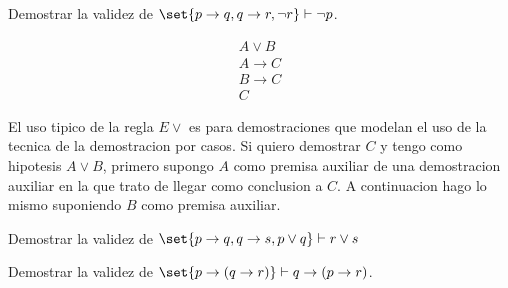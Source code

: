 \begin{example}
	Demostrar la validez de \(\set{p\rightarrow q, q \rightarrow r, \neg r} \vdash \neg p \).

\end{example}

\begin{definition}
	\[
		\begin{array}{c}
			A \vee B        \\
			A \rightarrow C \\
			B \rightarrow C \\ \hline
			C
		\end{array}
	\]
\end{definition}

\begin{remark}
	El uso tipico de la regla \(E \vee \) es para demostraciones que modelan el uso de la tecnica de la demostracion por casos. Si quiero demostrar \(C \) y tengo como hipotesis \(A \vee  B \), primero supongo \(A \) como premisa auxiliar de una demostracion auxiliar en la que trato de llegar como conclusion a \(C \). A continuacion hago lo mismo suponiendo \(B \) como premisa auxiliar.
\end{remark}

\begin{example}
	Demostrar la validez de \(\set{p \rightarrow q, q \rightarrow s, p \vee  q} \vdash r \vee s\)

\end{example}
\begin{example}
	Demostrar la validez de \(\set{p \rightarrow (q \rightarrow r)} \vdash q \rightarrow (p \rightarrow r )\).
\end{example}


